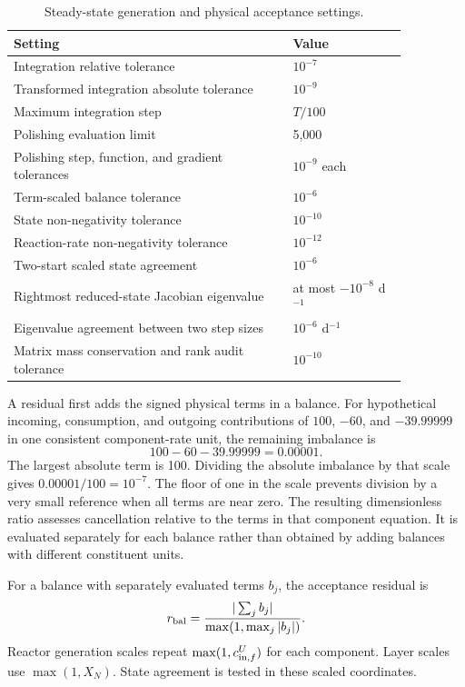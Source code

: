 \begin{table}[htbp]
\centering\small
\caption{Steady-state generation and physical acceptance settings.}\label{tab:plant_generation_settings}
\begin{tabular}{p{0.61\linewidth}p{0.25\linewidth}}
\toprule Setting & Value\\\midrule
Integration relative tolerance & $10^{-7}$\\
Transformed integration absolute tolerance & $10^{-9}$\\
Maximum integration step & $T/100$\\
Polishing evaluation limit & 5{,}000\\
Polishing step, function, and gradient tolerances & $10^{-9}$ each\\
Term-scaled balance tolerance & $10^{-6}$\\
State non-negativity tolerance & $10^{-10}$\\
Reaction-rate non-negativity tolerance & $10^{-12}$\\
Two-start scaled state agreement & $10^{-6}$\\
Rightmost reduced-state Jacobian eigenvalue & at most $-10^{-8}$ d$^{-1}$\\
Eigenvalue agreement between two step sizes & $10^{-6}$ d$^{-1}$\\
Matrix mass conservation and rank audit tolerance & $10^{-10}$\\
\bottomrule
\end{tabular}
\end{table}

A residual first adds the signed physical terms in a balance. For hypothetical incoming, consumption, and outgoing contributions of $100$, $-60$, and $-39.99999$ in one consistent component-rate unit, the remaining imbalance is
\[
100-60-39.99999=0.00001.
\]
The largest absolute term is 100. Dividing the absolute imbalance by that scale gives $0.00001/100=10^{-7}$. The floor of one in the scale prevents division by a very small reference when all terms are near zero. The resulting dimensionless ratio assesses cancellation relative to the terms in that component equation. It is evaluated separately for each balance rather than obtained by adding balances with different constituent units.

For a balance with separately evaluated terms $b_j$, the acceptance residual is
\begin{equation}
\equationname{Scaled component-equation acceptance residual}
r_{\rm bal}=\frac{|\sum_jb_j|}{\max(1,\max_j|b_j|)}.
\label{eq:plant_acceptance_balance}
\end{equation}
Reactor generation scales repeat $\max(1,c_{{\rm in},f}^U)$ for each component. Layer scales use $\max(1,X_N)$. State agreement is tested in these scaled coordinates.

